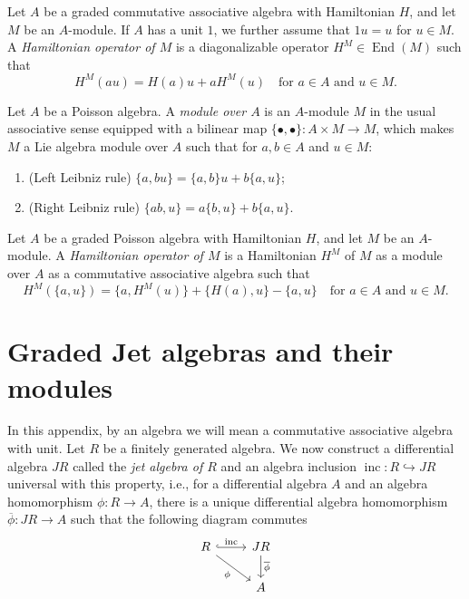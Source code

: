 \documentclass[a4paper, 12pt, reqno]{amsart}
\theoremstyle{remark}
\DeclareMathOperator{\End}{End}
\DeclareMathOperator{\inc}{inc}
\begin{document}
Let $A$ be a graded commutative associative algebra with Hamiltonian $H$, and let $M$ be an $A$-module.
If $A$ has a unit $1$, we further assume that $1u = u$ for $u \in M$.
A \emph{Hamiltonian operator of $M$} is a diagonalizable operator $H^M \in \End(M)$ such that
\begin{equation*}
  H^M(au) = H(a)u + aH^M(u) \quad \text{for $a \in A$ and $u \in M$}.
\end{equation*}

Let $A$ be a Poisson algebra.
A \emph{module over $A$} is an $A$-module $M$ in the usual associative sense equipped with a bilinear map $\{\bullet, \bullet\}: A \times M \to M$, which makes $M$ a Lie algebra module over $A$ such that for $a, b \in A$ and $u \in M$:
\begin{enumerate}
\item (Left Leibniz rule) $\{a, bu\} = \{a, b\}u + b\{a, u\}$;
\item (Right Leibniz rule) $\{ab, u\} = a\{b, u\} + b\{a, u\}$.
\end{enumerate}

Let $A$ be a graded Poisson algebra with Hamiltonian $H$, and let $M$ be an $A$-module.
A \emph{Hamiltonian operator of $M$} is a Hamiltonian $H^M$ of $M$ as a module over $A$ as a commutative associative algebra such that
\begin{equation*}
  H^M(\{a, u\}) = \{a, H^M(u)\} + \{H(a), u\} - \{a, u\} \quad \text{for $a \in A$ and $u \in M$}.
\end{equation*}

\section{Graded Jet algebras and their modules}
\label{sec:graded-jet-algebras}

In this appendix, by an algebra we will mean a commutative associative algebra with unit.
Let $R$ be a finitely generated algebra.
We now construct a differential algebra $JR$ called the \emph{jet algebra of $R$} and an algebra inclusion $\inc: R \hookrightarrow JR$ universal with this property, i.e., for a differential algebra $A$ and an algebra homomorphism $\phi: R \to A$, there is a unique differential algebra homomorphism $\overline{\phi}: JR \to A$ such that the following diagram commutes
\begin{equation*}
  \begin{tikzcd}
    R \arrow[r, "\inc", hook] \arrow[rd, "\phi"'] & JR \arrow[d, "\overline{\phi}"] \\
    & A
  \end{tikzcd}
\end{equation*}
\end{document}
